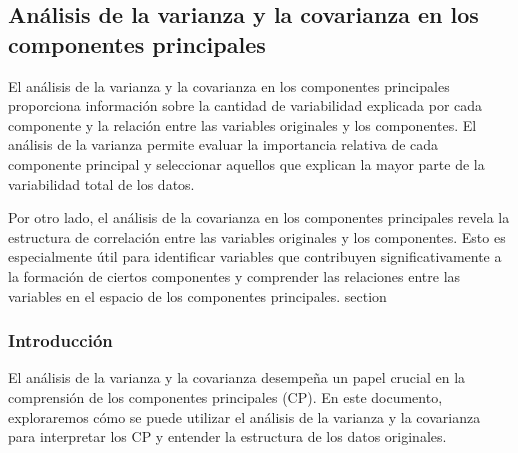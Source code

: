 \documentclass{article}
\begin{document}
\subsection{Análisis de la varianza y la covarianza en los componentes principales}
El análisis de la varianza y la covarianza en los componentes principales proporciona información sobre la cantidad de variabilidad explicada por cada componente y la relación entre las variables originales y los componentes. El análisis de la varianza permite evaluar la importancia relativa de cada componente principal y seleccionar aquellos que explican la mayor parte de la variabilidad total de los datos.

Por otro lado, el análisis de la covarianza en los componentes principales revela la estructura de correlación entre las variables originales y los componentes. Esto es especialmente útil para identificar variables que contribuyen significativamente a la formación de ciertos componentes y comprender las relaciones entre las variables en el espacio de los componentes principales.
section{}

\subsubsection{Introducción}
El análisis de la varianza y la covarianza desempeña un papel crucial en la comprensión de los componentes principales (CP). En este documento, exploraremos cómo se puede utilizar el análisis de la varianza y la covarianza para interpretar los CP y entender la estructura de los datos originales. 

\end{document}
